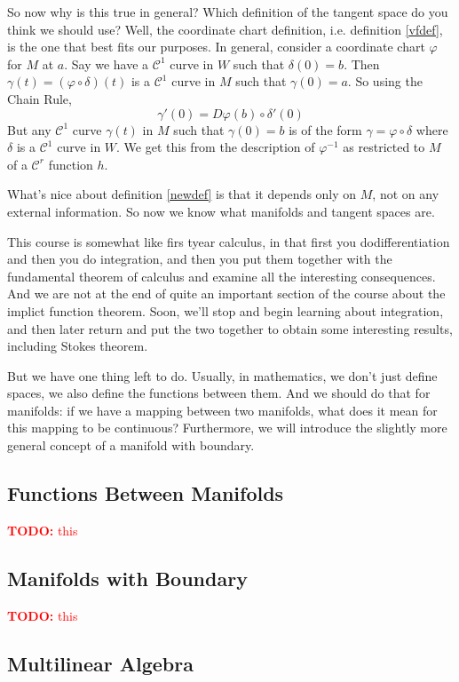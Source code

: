 \documentclass{article}
\newcommand{\mc}[1]{\mathcal{#1}}
\newcommand{\TODO}[1]{\textcolor{red}{\textbf{TODO:} #1}}
\begin{document}
So now why is this true in general? Which definition of the tangent space do you think we should use? Well, the coordinate chart definition, i.e. definition \ref{vfdef}, is the one that best fits our purposes. In general, consider a coordinate chart \(\varphi\) for \(M\) at \(a\). Say we have a \(\mc{C}^1\) curve in \(W\) such that \(\delta(0) = b\). Then
\(\gamma(t) = (\varphi \circ \delta)(t)\)
is a \(\mc{C}^1\) curve in \(M\) such that \(\gamma(0) = a\). So using the Chain Rule,
\[\gamma'(0) = D\varphi(b) \circ \delta'(0)\]
But any \(\mc{C}^1\) curve \(\gamma(t)\) in \(M\) such that \(\gamma(0) = b\) is of the form
\(\gamma = \varphi \circ \delta\)
where \(\delta\) is a \(\mc{C}^1\) curve in \(W\). We get this from the description of \(\varphi^{-1}\) as restricted to \(M\) of a \(\mc{C}^r\) function \(h\).

What's nice about definition \ref{newdef} is that it depends only on \(M\), not on any external information. So now we know what manifolds and tangent spaces are.

This course is somewhat like firs tyear calculus, in that first you dodifferentiation and then you do integration, and then you put them together with the fundamental theorem of calculus and examine all the interesting consequences. And we are not at the end of quite an important section of the course about the implict function theorem. Soon, we'll stop and begin learning about integration, and then later return and put the two together to obtain some interesting results, including Stokes theorem.

But we have one thing left to do. Usually, in mathematics, we don't just define spaces, we also define the functions between them. And we should do that for manifolds: if we have a mapping between two manifolds, what does it mean for this mapping to be continuous? Furthermore, we will introduce the slightly more general concept of a manifold with boundary.

\subsection{Functions Between Manifolds}

\TODO{this}

\subsection{Manifolds with Boundary}

\TODO{this}

\subsection{Multilinear Algebra}
\end{document}
